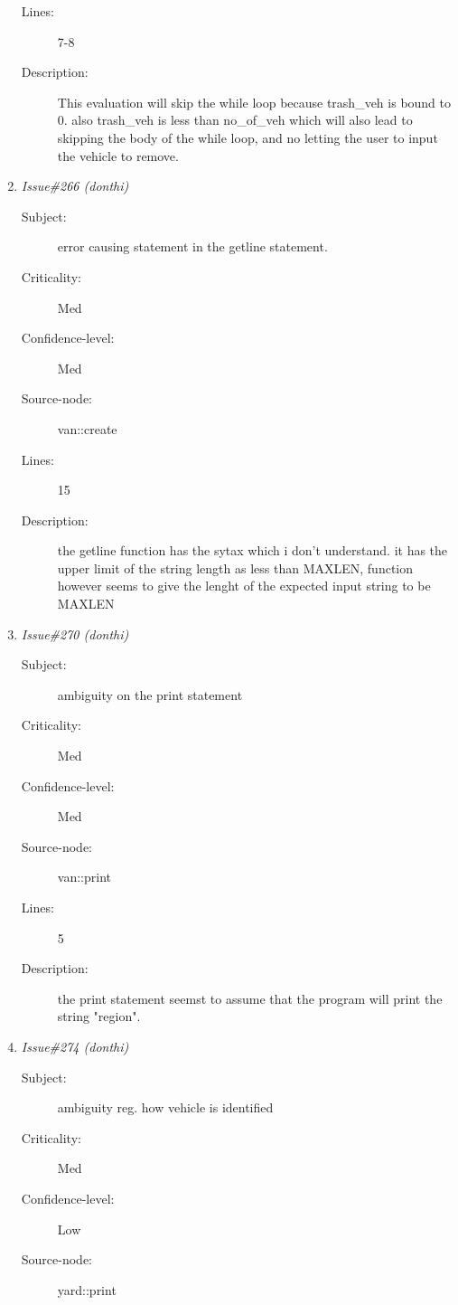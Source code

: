 \begin{enumerate}
\begin{description}
\item [Lines:] 7-8

\item [Description:] This evaluation will skip the while loop
because trash\_veh is bound to 0.  also trash\_veh is less than no\_of\_veh which
will also lead to skipping the body of the while loop, and no letting the
user to input the vehicle to remove.
\end{description}
\item {\it Issue\#266 (donthi)}
\begin{description}
\item [Subject:] error causing statement in the getline statement.
\item [Criticality:] Med
\item [Confidence-level:] Med
\item [Source-node:] van::create

\item [Lines:] 15

\item [Description:] the getline function has the sytax which i
don't understand.  it has the upper limit of the string length as less than
MAXLEN, function however seems to give the lenght of the expected input
string to be MAXLEN
\end{description}
\item {\it Issue\#270 (donthi)}
\begin{description}
\item [Subject:] ambiguity on the print statement
\item [Criticality:] Med
\item [Confidence-level:] Med
\item [Source-node:] van::print

\item [Lines:] 5

\item [Description:] the print statement seemst to assume that the
program will print the string "region".
\end{description}
\item {\it Issue\#274 (donthi)}
\begin{description}
\item [Subject:] ambiguity reg. how vehicle is identified
\item [Criticality:] Med
\item [Confidence-level:] Low
\item [Source-node:] yard::print


\end{description}
\end{enumerate}
